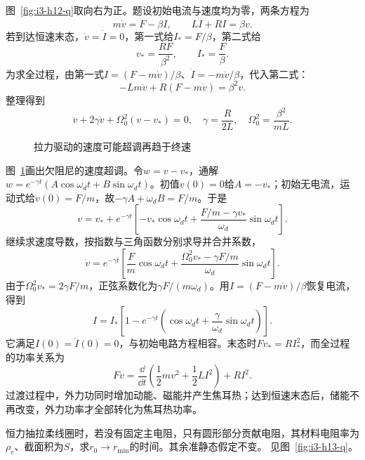 \begin{solution}
图~\ref{fig:i3-h12-q}取向右为正。题设初始电流与速度均为零，两条方程为
\[
m\dot v=F-\beta I,\qquad L\dot I+RI=\beta v.
\]
若到达恒速末态，$\dot v=\dot I=0$，第一式给$I_*=F/\beta$，第二式给
\[
\boxed{v_*=\frac{RF}{\beta^2}},\qquad I_*=\frac F\beta.
\]
为求全过程，由第一式$I=(F-m\dot v)/\beta$、$\dot I=-m\ddot v/\beta$，代入第二式：
\[
-Lm\ddot v+R(F-m\dot v)=\beta^2v.
\]
整理得到
\[
\ddot v+2\gamma\dot v+\Omega_0^2(v-v_*)=0,\quad
\gamma=\frac R{2L},\quad\Omega_0^2=\frac{\beta^2}{mL}.
\]
\begin{figure}[H]\centering
{}
\caption{拉力驱动的速度可能超调再趋于终速}\label{fig:i3-h12-s}
\end{figure}
图~\ref{fig:i3-h12-s}画出欠阻尼的速度超调。令$w=v-v_*$，通解$w=e^{-\gamma t}(A\cos\omega_dt+B\sin\omega_dt)$。初值$v(0)=0$给$A=-v_*$；初始无电流，运动式给$\dot v(0)=F/m$，故$-\gamma A+\omega_dB=F/m$。于是
\[
\boxed{v=v_*+e^{-\gamma t}
\left[-v_*\cos\omega_dt+
\frac{F/m-\gamma v_*}{\omega_d}\sin\omega_dt\right]}.
\]
继续求速度导数，按指数与三角函数分别求导并合并系数，
\[\dot v=e^{-\gamma t}\left[\frac Fm\cos\omega_dt
+\frac{\Omega_0^2v_*-\gamma F/m}{\omega_d}\sin\omega_dt\right].\]
由于$\Omega_0^2v_*=2\gamma F/m$，正弦系数化为$\gamma F/(m\omega_d)$。用$I=(F-m\dot v)/\beta$恢复电流，得到
\[
I=I_*\left[1-e^{-\gamma t}
\left(\cos\omega_dt+\frac{\gamma}{\omega_d}\sin\omega_dt\right)\right].
\]
它满足$I(0)=\dot I(0)=0$，与初始电路方程相容。末态时$Fv_*=RI_*^2$，而全过程的功率关系为
\[
Fv=\frac{\dd}{\dd t}\left(\frac12mv^2+\frac12LI^2\right)+RI^2.
\]
过渡过程中，外力功同时增加动能、磁能并产生焦耳热；达到恒速末态后，储能不再改变，外力功率才全部转化为焦耳热功率。
\end{solution}

\begin{exercise}[电阻随圆环半径变化的抽拉模型]\label{ex:i3-h13}
恒力抽拉柔线圈时，若没有固定主电阻，只有圆形部分贡献电阻，其材料电阻率为$\rho_e$、截面积为$S$，求$r_0\to r_{\min}$的时间。其余准静态假定不变。 见图~\ref{fig:i3-h13-q}。
\end{exercise}

